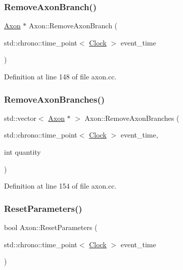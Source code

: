 \subsubsection{\texorpdfstring{Remove\+Axon\+Branch()}{RemoveAxonBranch()}}
{\footnotesize\ttfamily \mbox{\hyperlink{class_axon}{Axon}} $\ast$ Axon\+::\+Remove\+Axon\+Branch (\begin{DoxyParamCaption}\item[{std\+::chrono\+::time\+\_\+point$<$ \mbox{\hyperlink{universe_8h_a0ef8d951d1ca5ab3cfaf7ab4c7a6fd80}{Clock}} $>$}]{event\+\_\+time }\end{DoxyParamCaption})}



Definition at line 148 of file axon.\+cc.

\mbox{\label{class_axon_a4c7af6c0900ae766c55362bfbb827ce3}} 
\subsubsection{\texorpdfstring{Remove\+Axon\+Branches()}{RemoveAxonBranches()}}
{\footnotesize\ttfamily std\+::vector$<$ \mbox{\hyperlink{class_axon}{Axon}} $\ast$ $>$ Axon\+::\+Remove\+Axon\+Branches (\begin{DoxyParamCaption}\item[{std\+::chrono\+::time\+\_\+point$<$ \mbox{\hyperlink{universe_8h_a0ef8d951d1ca5ab3cfaf7ab4c7a6fd80}{Clock}} $>$}]{event\+\_\+time,  }\item[{int}]{quantity }\end{DoxyParamCaption})}



Definition at line 154 of file axon.\+cc.

\mbox{\label{class_axon_ae079e0b47f5027625da158930e4fa9c5}} 
\subsubsection{\texorpdfstring{Reset\+Parameters()}{ResetParameters()}}
{\footnotesize\ttfamily bool Axon\+::\+Reset\+Parameters (\begin{DoxyParamCaption}\item[{std\+::chrono\+::time\+\_\+point$<$ \mbox{\hyperlink{universe_8h_a0ef8d951d1ca5ab3cfaf7ab4c7a6fd80}{Clock}} $>$}]{event\+\_\+time }\end{DoxyParamCaption})}



